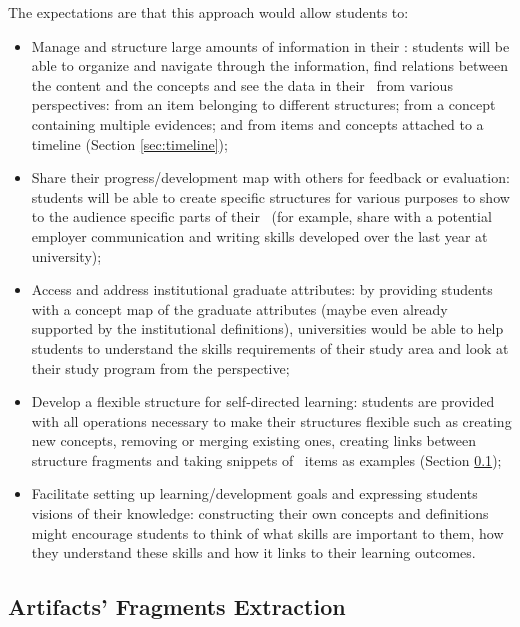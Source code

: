 The expectations are that this approach would allow students to:

\begin{itemize}
  \item Manage and structure large amounts of information in their \ep:
  students will be able to organize and navigate through the information, find
  relations between the content and the concepts and see the data in their
  \ep~from various perspectives: from an item belonging to different
  structures; from a concept containing multiple evidences; and from items and
  concepts attached to a timeline (Section \ref{sec:timeline});

\item Share their progress/development map with others for feedback or
evaluation: students will be able to create specific structures for various
purposes to show to the audience specific parts of their \ep~(for example,
share with a potential employer communication and writing skills developed over
the last year at university);

\item Access and address institutional graduate attributes: by providing
students with a concept map of the graduate attributes (maybe even already
supported by the institutional definitions), universities would be able to
help students to understand the skills requirements of their study area and look
at their study program from the \LLLs perspective;

\item Develop a flexible structure for self-directed learning: students are
provided with all operations necessary to make their structures flexible such as
creating new concepts, removing or merging existing ones, creating links between
structure fragments and taking snippets of \ep~items as examples (Section
\ref{sec:frag});

\item Facilitate setting up learning/development goals and expressing students
visions of their knowledge: constructing their own concepts and definitions
might encourage students to think of what skills are important to them, how they
understand these skills and how it links to their learning outcomes.
\end{itemize}

\subsection{Artifacts' Fragments Extraction}
\label{sec:frag}

